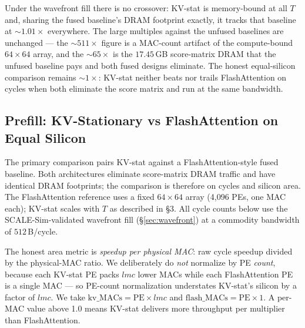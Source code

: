 \documentclass[11pt]{article}
\begin{document}
Under the wavefront fill there is no crossover: KV-stat is memory-bound
at all \(T\) and, sharing the fused baseline's DRAM footprint exactly,
it tracks that baseline at \(\sim\!1.01\times\) everywhere. The large
multiples against the unfused baselines are unchanged --- the
\(\sim\!511\times\) figure is a MAC-count artifact of the compute-bound
\(64{\times}64\) array, and the \(\sim\!65\times\) is the
\(17.45\,\)GB score-matrix DRAM that the unfused baseline pays and both
fused designs eliminate. The honest equal-silicon comparison remains
\(\sim\!1\times\): KV-stat neither beats nor trails FlashAttention on
cycles when both eliminate the score matrix and run at the same
bandwidth.

\subsection{Prefill: KV-Stationary vs FlashAttention on Equal Silicon}
\label{sec:equalsilicon}

The primary comparison pairs KV-stat against a FlashAttention-style
fused baseline.
Both architectures eliminate score-matrix DRAM traffic and have
identical DRAM footprints; the comparison is therefore on
cycles and silicon area.
The FlashAttention reference uses a fixed \(64 \times 64\) array
(4{,}096 PEs, one MAC each); KV-stat scales with \(T\) as described in \S3.
All cycle counts below use the SCALE-Sim-validated wavefront fill
(\S\ref{sec:wavefront}) at a commodity bandwidth of \(512\,\)B/cycle.

The honest area metric is \textit{speedup per physical MAC}:
raw cycle speedup divided by the physical-MAC ratio. We deliberately
do \emph{not} normalize by PE \emph{count}, because each KV-stat PE packs
\(lmc\) lower MACs while each FlashAttention PE is a single MAC --- so
PE-count normalization understates KV-stat's silicon by a factor of \(lmc\).
We take \(\text{kv\_MACs} = \text{PE} \times lmc\) and
\(\text{flash\_MACs} = \text{PE} \times 1\). A per-MAC value above 1.0 means
KV-stat delivers more throughput per multiplier than FlashAttention.
\end{document}
